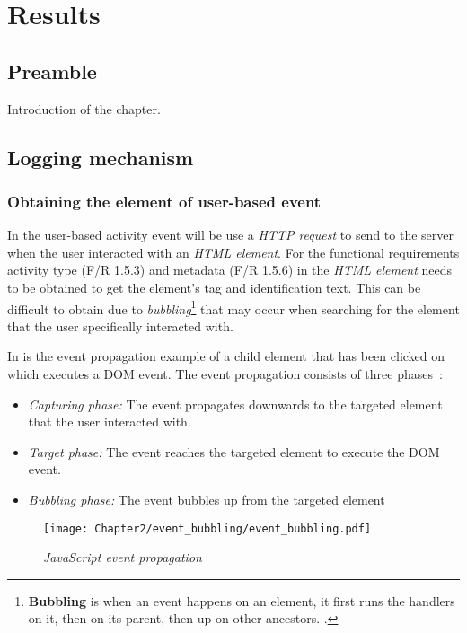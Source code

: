 \chapter{Results}
\label{chap:3}

\section{Preamble}
Introduction of the chapter.

\section{Logging mechanism}

\subsection{Obtaining the element of user-based event}\label{sec:ch2_ElementObtaining}
In  the user-based activity event will be use a \textit{HTTP request} to send to the server when the user interacted with an \textit{HTML element}. For the functional requirements activity type (F/R 1.5.3) and metadata (F/R 1.5.6) in  the \textit{HTML element} needs to be obtained to get the element's tag and identification text. This can be difficult to obtain due to \textit{bubbling}\footnote{\textbf{Bubbling} is when an event happens on an element, it first runs the handlers on it, then on its parent, then up on other ancestors. \cite{EventBubbling}.} that may occur when searching for the element that the user specifically interacted with.\par In  is the event propagation example of a child element that has been clicked on which executes a DOM event. The event propagation consists of three phases~\cite{EventBubbling}:

\begin{itemize}
	\item \textit{Capturing phase:} The event propagates downwards to the targeted element that the user interacted with.
	\item \textit{Target phase:} The event reaches the targeted element to execute the DOM event.
	\item \textit{Bubbling phase:} The event bubbles up from the targeted element
\end{itemize}

\begin{figure}[!htb] %
	\centering %
	\texttt{[image: Chapter2/event\_bubbling/event\_bubbling.pdf]}
	\caption[JavaScript event propagation]
	{\textit{JavaScript event propagation~\cite{EventBubbling}}}\label{fig:ch2_event_bubbling}
\end{figure}

